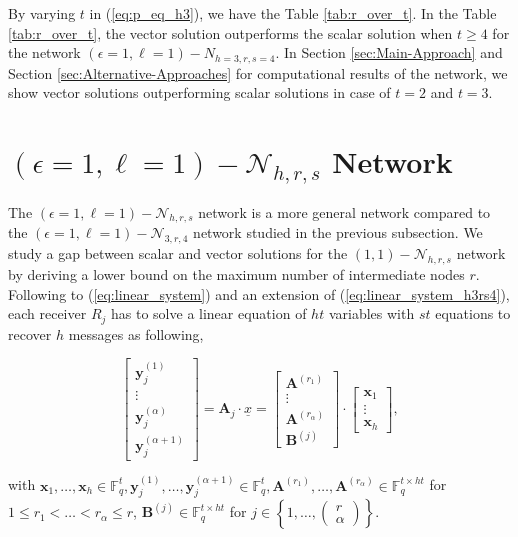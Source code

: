 By varying $t$ in (\ref{eq:p_eq_h3}), we have the Table \ref{tab:r_over_t}.
In the Table \ref{tab:r_over_t}, the vector solution outperforms
the scalar solution when $t\geq4$ for the network $\left(\epsilon=1,\ell=1\right)-\ensuremath{N}_{h=3,r,s=4}$.
In Section \ref{sec:Main-Approach} and Section \ref{sec:Alternative-Approaches}
for computational results of the network, we show vector solutions
outperforming scalar solutions in case of $t=2$ and $t=3$.


\section{$\left(\epsilon=1,\ell=1\right)-\mathcal{N}_{h,r,s}$ Network \label{sec:e1l1_nw}}

The $\left(\epsilon=1,\ell=1\right)-\mathcal{N}_{h,r,s}$ network
is a more general network compared to the $\left(\epsilon=1,\ell=1\right)-\mathcal{N}_{3,r,4}$
network studied in the previous subsection. We study a gap between
scalar and vector solutions for the $\left(1,1\right)-\mathcal{N}_{h,r,s}$
network by deriving a lower bound on the maximum number of intermediate
nodes $r$. Following to (\ref{eq:linear_system}) and an extension
of (\ref{eq:linear_system_h3rs4}), each receiver $R_{j}$ has to
solve a linear equation of $ht$ variables with $st$ equations to
recover $h$ messages as following,

\[
\left[\begin{array}{c}
\boldsymbol{y}_{j}^{\left(1\right)}\\
\vdots\\
\boldsymbol{y}_{j}^{\left(\alpha\right)}\\
\boldsymbol{y}_{j}^{\left(\alpha+1\right)}
\end{array}\right]=\boldsymbol{A}_{j}\cdot\underline{x}=\left[\begin{array}{c}
\boldsymbol{A}^{\left(r_{1}\right)}\\
\vdots\\
\boldsymbol{A}^{\left(r_{\alpha}\right)}\\
\boldsymbol{B}^{\left(j\right)}
\end{array}\right]\cdot\left[\begin{array}{c}
\boldsymbol{x}_{1}\\
\vdots\\
\boldsymbol{x}_{h}
\end{array}\right],
\]

with $\boldsymbol{x}_{1},\ldots,\boldsymbol{x}_{h}\in\ensuremath{\mathbb{F}}_{q}^{t},\boldsymbol{y}_{j}^{\left(1\right)},\ldots,\boldsymbol{y}_{j}^{\left(\alpha+1\right)}\in\ensuremath{\mathbb{F}}_{q}^{t},\boldsymbol{A}^{\left(r_{1}\right)},\ldots,\boldsymbol{A}^{\left(r_{\alpha}\right)}\in\ensuremath{\mathbb{F}}_{q}^{t\times ht}$
for $1\leq r_{1}<\ldots<r_{\alpha}\leq r$, $\boldsymbol{B}^{\left(j\right)}\in\ensuremath{\mathbb{F}}_{q}^{t\times ht}$
for $j\in\left\{ 1,\ldots,\left(\begin{array}{c}
r\\
\alpha
\end{array}\right)\right\} $.

